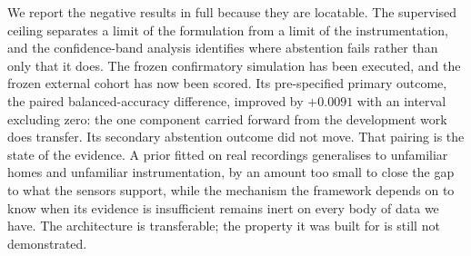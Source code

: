 \documentclass[11pt]{article}
\begin{document}
We report the negative results in full because they are locatable. The
supervised ceiling separates a limit of the formulation from a limit of the
instrumentation, and the confidence-band analysis identifies where abstention
fails rather than only that it does. The frozen confirmatory simulation has been
executed, and the frozen external cohort has now been scored. Its pre-specified primary outcome, the paired balanced-accuracy
difference, improved by $+0.0091$ with an interval excluding zero: the one
component carried forward from the development work does transfer. Its
secondary abstention outcome did not move. That pairing is the state of the
evidence. A prior fitted on real recordings generalises to unfamiliar homes and
unfamiliar instrumentation, by an amount too small to close the gap to what the
sensors support, while the mechanism the framework depends on to know when its
evidence is insufficient remains inert on every body of data we have. The
architecture is transferable; the property it was built for is still not
demonstrated.

\printbibliography
\end{document}
